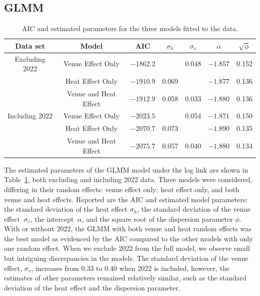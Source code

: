 \documentclass[12pt, letterpaper, titlepage]{article}
\begin{document}
\subsection{GLMM} \label{subsec:Results_GLMM}

\begin{table}
  \centering
  \caption{AIC and estimated parameters for the three models fitted to the
    data.}
  \label{tab:Gamma_parameters}
  \begin{tabular}{c c c c c c c}
    \toprule
    Data set & Model & AIC & $\sigma_h$ & $\sigma_v$ & $\alpha$ & $\sqrt{\phi}$ \\
    \midrule
    Excluding 2022 &
      Venue Effect Only & $-1862.2$ &   & 0.048 & $-1.857$ & 0.152\\
     & Heat Effect Only & $-1910.9$ & 0.069 &  & $-1.877$ & 0.136\\
     & Venue and Heat Effect & $-1912.9$ & 0.058 & 0.033 & $-1.880$ & 0.136\\[1ex]
    Including 2022 &
    Venue Effect Only & $-2023.5$ &   & 0.054 & $-1.871$ & 0.150\\
    & Heat Effect Only & $-2070.7$ & 0.073 &  & $-1.890$ & 0.135\\
    & Venue and Heat Effect & $-2075.7$ & 0.057 & 0.040 & $-1.880$ & 0.134\\
    \bottomrule
  \end{tabular}
\end{table}


The estimated parameters of the GLMM model under the log link are shown in 
Table~\ref{tab:Gamma_parameters}, both excluding and including 2022 data.
Three models were considered, differing in their random effects: venue effect
only; heat effect only, and both venue and heat effects. Reported are the AIC
and estimated model parameters: the standard deviation
of the heat effect $\sigma_h$, the standard deviation of the venue
effect~$\sigma_v$, the intercept~$\alpha$, and the
square root of the dispersion parameter $\phi$. With or without 2022,
the GLMM with both venue and heat random effects was the best model as evidenced
by the AIC compared to the other models with only one random
effect.  When we exclude 2022 from the full model, we observe small but intriguing
discrepancies in the models. The standard deviation of the venue effect, 
$\sigma_v$, increases from 0.33 to 0.40 when 2022 is included, however, the
estimates of other parameters
remained relatively similar, such as the standard deviation of the heat effect
and the dispersion parameter.
\end{document}
